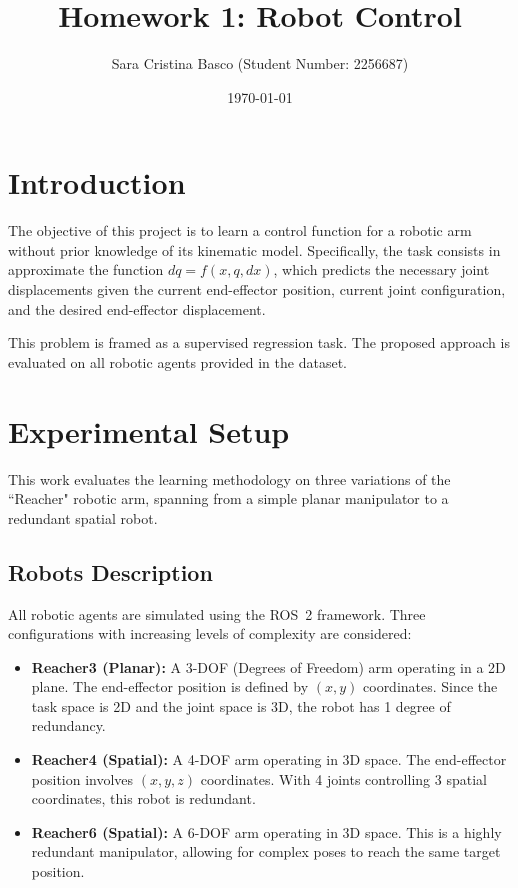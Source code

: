 \documentclass[a4paper,11pt]{article}
\title{\textbf{Homework 1: Robot Control}}
\author{Sara Cristina Basco (Student Number: 2256687)}
\date{\today}
\begin{document}
\maketitle

\section{Introduction}
The objective of this project is to learn a control function for a robotic arm without prior knowledge of its kinematic model. Specifically, the task consists in approximate the function $dq = f(x, q, dx)$, which predicts the necessary joint displacements given the current end-effector position, current joint configuration, and the desired end-effector displacement.

This problem is framed as a supervised regression task. The proposed approach is evaluated on all robotic agents provided in the dataset.

\section{Experimental Setup}
This work evaluates the learning methodology on three variations of the “Reacher" robotic arm, spanning from a simple planar manipulator to a redundant spatial robot.

\subsection{Robots Description}
All robotic agents are simulated using the ROS~2 framework. Three configurations with increasing levels of complexity are considered:

\begin{itemize}
    \item \textbf{Reacher3 (Planar):} A 3-DOF (Degrees of Freedom) arm operating in a 2D plane. The end-effector position is defined by $(x, y)$ coordinates. Since the task space is 2D and the joint space is 3D, the robot has 1 degree of redundancy.
    \item \textbf{Reacher4 (Spatial):} A 4-DOF arm operating in 3D space. The end-effector position involves $(x, y, z)$ coordinates. With 4 joints controlling 3 spatial coordinates, this robot is redundant.
    \item \textbf{Reacher6 (Spatial):} A 6-DOF arm operating in 3D space. This is a highly redundant manipulator, allowing for complex poses to reach the same target position.
\end{itemize}
\end{document}
